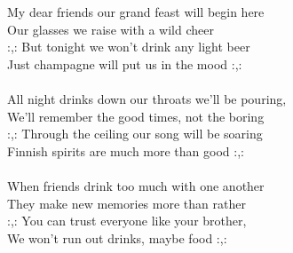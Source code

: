 
            My dear friends our grand feast will begin here \\
            Our glasses we raise with a wild cheer \\
            :,: But tonight we won’t drink any light beer \\
            Just champagne will put us in the mood :,: \\
\hspace{10mm} \\
            All night drinks down our throats we’ll be pouring, \\
            We’ll remember the good times, not the boring \\
            :,: Through the ceiling our song will be soaring \\
            Finnish spirits are much more than good :,: \\
\hspace{10mm} \\
            When friends drink too much with one another \\
            They make new memories more than rather \\
            :,: You can trust everyone like your brother, \\
            We won’t run out drinks, maybe food :,: \\
